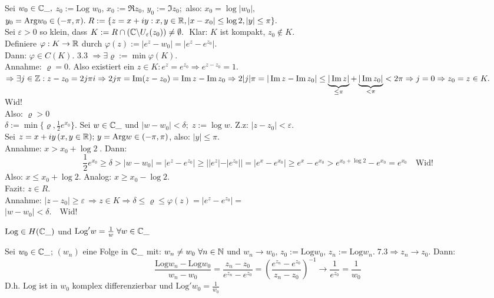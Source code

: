 \documentclass[a4paper,twoside,DIV15,BCOR12mm]{scrbook}
\def\Arg{\text{Arg}}
\def\Log{\text{Log}}
\begin{document}
\begin{beweis}
Sei $w_0 \in \mathbb{C}\_ ,$
$z_0 := \Log $ $w_0, \, x_0 := \Re z_0, \, y_0:=\Im z_0;$ also: $x_0 = \log |w_0|,$
$y_0 = \Arg w_0 \in (-\pi,\pi). \; R:= \{ z= x+iy: x,y \in \MdR, |x-x_0| \leq \log 2, |y| \leq  \pi \}.$\\
Sei $\varepsilon > 0$ so klein, dass $K:= R \cap \left( \mathbb{C} \backslash U_{\varepsilon}(z_0)\right) \not= \emptyset.\; $ Klar: $K$ ist kompakt, $z_0 \notin K.$\\
Definiere $\varphi: K \rightarrow \mathbb{R}$ durch $\varphi(z):= |e^z - w_0| = |e^z - e^{z_0}|$.\\
Dann: $\varphi \in C(K)$. 3.3 $\Rightarrow \exists \varrho := \min \varphi(K).$ \\
Annahme: $\varrho = 0$. Also existiert ein $z \in K: e^z = e^{z_0} \Rightarrow e^{z-z_0}=1.$  $\Rightarrow \exists j \in \mathbb{Z}: z-z_0 = 2j\pi i \Rightarrow 2j\pi = \mathop{\rm Im}\nolimits(z-z_0) = \mathop{\rm Im}\nolimits z - \mathop{\rm Im}\nolimits z_0 \Rightarrow 2|j|\pi = |\mathop{\rm Im}\nolimits z - \mathop{\rm Im}\nolimits z_0| \leq \underbrace{|\mathop{\rm Im}\nolimits z|}_{\leq \pi} + \underbrace{|\mathop{\rm Im}\nolimits z_0|}_{< \pi} < 2\pi \Rightarrow j = 0 \Rightarrow z_0 = z \in K.$ Wid!\\
Also: $\varrho > 0$\\
$\delta := \min\{ \varrho, \frac1{2}e^{x_0}\}.$ Sei $w \in \mathbb{C}\_$ und $|w-w_0| < \delta; \; z:=\log w.$ \; Z.z: $|z-z_0|<\varepsilon.$ \\
Sei $z=x+iy \, (x,y \in \MdR); \, y = \Arg w \in (-\pi,\pi)$, also: $|y| \leq \pi$. \\
Annahme: $x>x_0 + \log 2 \;$. Dann:\\
\[
\frac{1}{2} e^{x_0} \geq \delta > |w-w_0| = |e^z - e^{z_0}| \geq | |e^z| - |e^{z_0}| | = |e^x - e^{x_0}| \geq e^x - e^{x_0} > e^{x_0 + \log 2} - e^{x_0} = e^{x_0} \quad \mbox{Wid!}
\]
Also: $x \leq x_0 + \log 2.$ Analog: $x \geq x_0 - \log 2.$ \\
Fazit: $z\in R.$\\
Annahme: $|z-z_0| \geq \varepsilon \, \Rightarrow z\in K \Rightarrow \delta \leq \varrho \leq \varphi(z) = |e^z - e^{z_0}| = $\\
$|w-w_0| < \delta. \quad \mbox{Wid!}$
\end{beweis}

\begin{satz}
$\Log \in H(\MdC\_)$ und $\Log'w= \frac1w \; \forall w \in \MdC\_$
\end{satz}

\begin{beweis}
Sei $w_0 \in \mathbb{C}\_$; $(w_n)$ eine Folge in $\mathbb{C}\_$ mit: $w_n \not= w_0 \ \forall n \in \mathbb{N}$ und $w_n \rightarrow w_0, \, z_0 := \Log w_0, \, z_n:=\Log w_n. \; 7.3 \Rightarrow z_n \rightarrow z_0.$ Dann:\\
\[
\frac{\Log w_n - \Log w_0}{w_n - w_0} = \frac{z_n-z_0}{e^{z_n}-e^{z_0}} = \left(\frac{e^{z_n}-e^{z_0}}{z_n -z_0}\right)^{-1} \rightarrow \frac1{e^{z_0}} = \frac1{w_0}
\]
D.h. $\Log$ ist in $w_0$ komplex differenzierbar und $\Log'w_0 = \frac1{w_0}$
\end{beweis}
\end{document}
